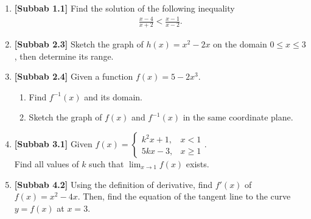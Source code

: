 \documentclass[10pt,openany,a4paper]{article}
\theoremstyle{definition}
\theoremstyle{definition}
\theoremstyle{plain}
\begin{document}
\newpage

\begin{enumerate}
    \item \textbf{[Subbab 1.1]} Find the solution of the following inequality
    \begin{align*}
        \frac{x-4}{x+2}<\frac{x-1}{x-2}.
    \end{align*}

    \item \textbf{[Subbab 2.3]} Sketch the graph of $h(x)=x^2-2x$ on the domain $0\leq x\leq 3$, then determine its range.

    \item \textbf{[Subbab 2.4]} Given a function $f(x)=5-2x^3$.
    \begin{enumerate}
        \item[a)] Find $f^{-1}(x)$ and its domain.
        \item[b)] Sketch the graph of $f(x)$ and $f^{-1}(x)$ in the same coordinate plane.
    \end{enumerate}

    \item \textbf{[Subbab 3.1]} Given $f(x)=\begin{cases}
        k^2x+1, & x<1\\
        5kx-3, & x\geq 1
    \end{cases}$.\\
    Find all values of $k$ such that $\displaystyle\lim_{x\to 1}f(x)$ exists.

    \item \textbf{[Subbab 4.2]} Using the definition of derivative, find $f'(x)$ of $f(x)=x^2-4x$. Then, find the equation of the tangent line to the curve $y=f(x)$ at $x=3$.
\end{enumerate}

\newpage
\end{document}
